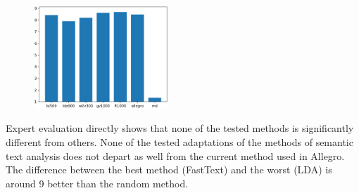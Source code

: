 \documentclass[twoside,twocolumn]{article}
\begin{document}
	
	
	
	\begin{figure}
		\centering
		\includegraphics[width=0.45\textwidth]{results.png}
		\caption{}
	\end{figure}
	
	Expert evaluation directly shows that none of the tested methods is significantly different
	from others. None of the tested adaptations of the methods of semantic text analysis does not depart as well
	from the current method used in Allegro. The difference between the best method (FastText)
	and the worst (LDA) is around 9%
	better than the random method.
	
\end{document}
